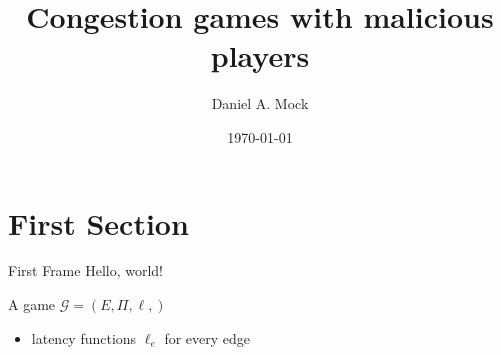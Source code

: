 \documentclass{beamer}
\title{Congestion games with malicious players}
\date{\today}
\author{Daniel A. Mock}
\institute{Lehrstuhl i1 -- RWTH Aachen}
\begin{document}
	\maketitle
	
	\section{First Section}

	\begin{frame}{First Frame}
		Hello, world!
		
		\begin{definition}[game]
			A game $\mathcal{G} = (E, \Pi, \ell,)$
		\end{definition}
	
		\begin{itemize}
			\item latency functions $\ell_e$ for every edge
		\end{itemize}
	\end{frame}
\end{document}
